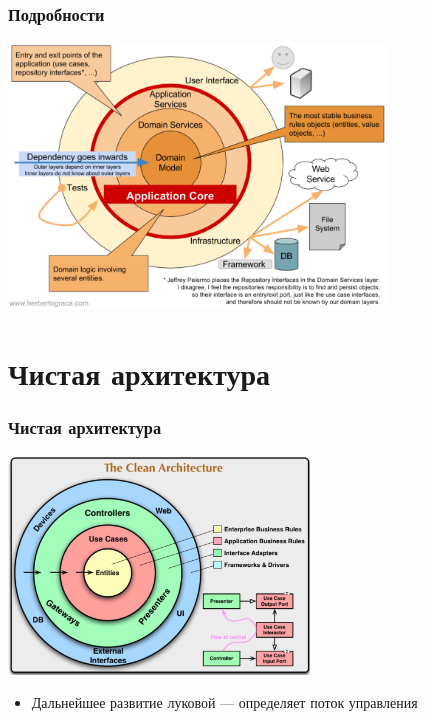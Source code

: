 \documentclass{../../slides-style}
\begin{document}
    \begin{frame}
        \frametitle{Подробности}
        \begin{center}
            \includegraphics[width=0.75\textwidth]{onionArchitectureDetails.png}
        \end{center}
    \end{frame}

    \section{Чистая архитектура}

    \begin{frame}
        \frametitle{Чистая архитектура}
        \begin{center}
            \includegraphics[width=0.6\textwidth]{cleanArchitecture.png}
        \end{center}
        \begin{itemize}
            \item Дальнейшее развитие луковой --- определяет поток управления
        \end{itemize}
    \end{frame}
\end{document}

